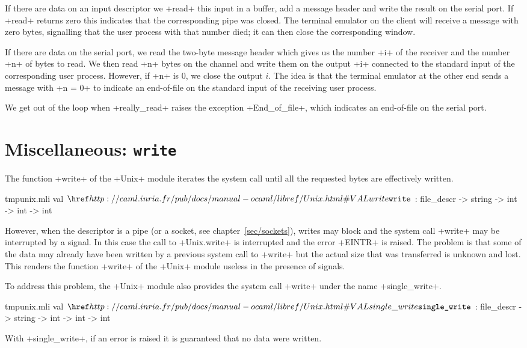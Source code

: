 \begin{example}
If there are data on an input descriptor we \ml+read+ this input in a
buffer, add a message header and write the result on the serial
port. If \ml+read+ returns zero this indicates that the corresponding
pipe was closed. The terminal emulator on the client will receive a
message with zero bytes, signalling that the user process
  with that number died; it can then close the corresponding window.

If there are data on the serial port, we read the two-byte message
header which gives us the number \ml+i+ of the receiver and the number
\ml+n+ of bytes to read. We then read \ml+n+ bytes on the channel and
write them on the output \ml+i+ connected to the standard input of the
corresponding user process. However, if \ml+n+ is 0, we close the
output $i$. The idea is that the terminal emulator at the other end
sends a message with \ml+n = 0+ to indicate an end-of-file on the
standard input of the receiving user process.

We get out of the loop when \ml+really_read+ raises the exception
\ml+End_of_file+, which indicates an end-of-file on the
serial port.
\end{example}

\section{Miscellaneous: \texttt{write}}
\label{single_write}

The function \ml+write+ of the \ml+Unix+ module iterates the system call
 until all the requested bytes are effectively written.
\begin{listingcodefile}{tmpunix.mli}
val $\libvalue{Unix}{write}$ : file_descr -> string -> int -> int -> int
\end{listingcodefile}
% 
However, when the descriptor is a pipe (or a socket, see
chapter~\ref{sec/sockets}), writes may block and the system call
\ml+write+ may be interrupted by a signal. In this case the {\ocaml}
call to \ml+Unix.write+ is interrupted and the error \ml+EINTR+ is
raised. The problem is that some of the data may already have been
written by a previous system call to \ml+write+ but the actual size
that was transferred is unknown and lost. This renders the function 
\ml+write+ of the \ml+Unix+ module useless in the presence of signals.
 
To address this problem, the \ml+Unix+ module also provides the
 system call \ml+write+ under the name
\ml+single_write+. 
\begin{listingcodefile}{tmpunix.mli}
val $\libvalue{Unix}{single\_write}$ : file_descr -> string -> int -> int -> int
\end{listingcodefile}
With \ml+single_write+, if an error is raised it is guaranteed that no
data were written.

